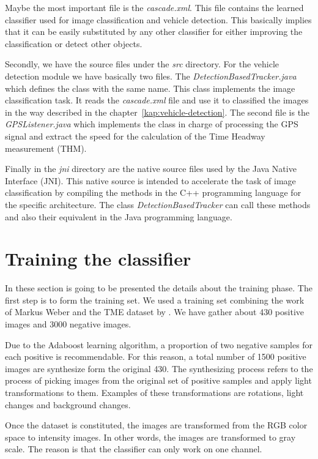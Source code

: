 Maybe the most important file is the \textit{cascade.xml}. This file contains
the learned classifier used for image classification and vehicle detection. This
basically implies that it can be easily substituted by any other classifier for
either improving the classification or detect other objects.

Secondly, we have the source files under the \textit{src} directory. For the
vehicle detection module we have basically two files. The
\textit{DetectionBasedTracker.java} which defines the class with the same name.
This class implements the image classification task. It reads the
\textit{cascade.xml} file and use it to classified the images in the way
described in the chapter~\ref{kap:vehicle-detection}. The second file is the
\textit{GPSListener.java} which implements the class in charge of processing the
GPS signal and extract the speed for the calculation of the Time Headway
measurement (THM). 

Finally in the \textit{jni} directory are the native source files used by the
Java Native Interface (JNI). This native source is intended to accelerate the
task of image classification by compiling the methods in the C++ programming
language for the specific architecture. The class \textit{DetectionBasedTracker} 
can call these methods and also their equivalent in the Java programming
language.


\section{Training the classifier} %
\label{sec:trainingClasssifier}

In these section is going to be presented the details about the training phase.
The first step is to form the training set. We used a training set combining the
work of Markus Weber and the TME dataset by \cite{tme}. We have gather about 430
positive images and 3000 negative images.

Due to the Adaboost learning algorithm, a proportion of two negative samples for
each positive is recommendable. For this reason, a total number of 1500 positive
images are synthesize form the original 430. The synthesizing process refers to
the process of picking images from the original set of positive samples and
apply light transformations to them. Examples of these transformations are
rotations, light changes and background changes.

Once the dataset is constituted, the images are transformed from the RGB color
space to intensity images. In other words, the images are transformed to gray
scale. The reason is that the classifier can only work on one channel.

